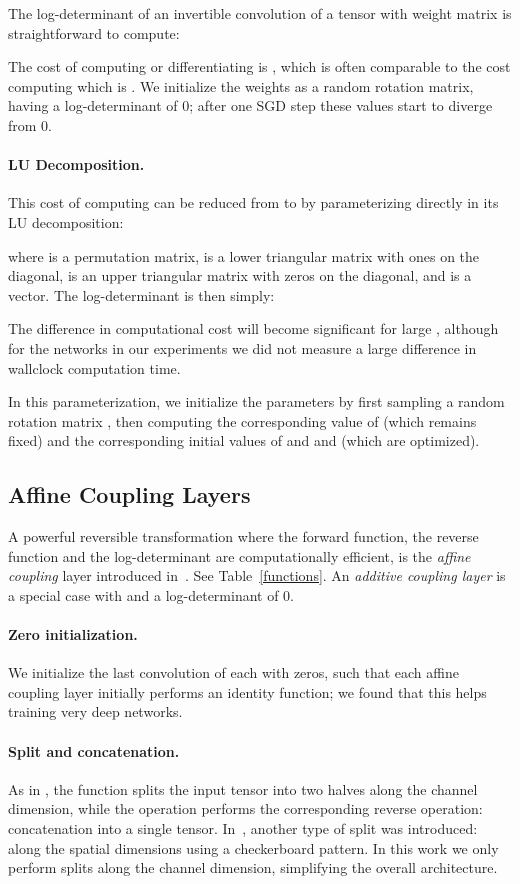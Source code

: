 \documentclass{article}
\begin{document}
The log-determinant of an invertible  convolution of a  tensor  with  weight matrix  is straightforward to compute:

The cost of computing or differentiating  is , which is often comparable to the cost computing  which is . We initialize the weights  as a random rotation matrix, having a log-determinant of 0; after one SGD step these values start to diverge from 0.

\paragraph{LU Decomposition.} This cost of computing  can be reduced from  to  by parameterizing  directly in its LU decomposition:

where  is a permutation matrix,  is a lower triangular matrix with ones on the diagonal,  is an upper triangular matrix with zeros on the diagonal, and  is a vector. The log-determinant is then simply:

The difference in computational cost will become significant for large , although for the networks in our experiments we did not measure a large difference in wallclock computation time.

In this parameterization, we initialize the parameters by first sampling a random rotation matrix , then computing the corresponding value of  (which remains fixed) and the corresponding initial values of  and  and  (which are optimized).

\subsection{Affine Coupling Layers}
\label{sec:affine}

A powerful reversible transformation where the forward function, the reverse function and the log-determinant are computationally efficient, is the \emph{affine coupling} layer introduced in~\citep{dinh2014nice,dinh2016density}. See Table~\ref{functions}. An \emph{additive coupling layer} is a special case with  and a log-determinant of 0.

\paragraph{Zero initialization.} We initialize the last convolution of each  with zeros, such that each affine coupling layer initially performs an identity function; we found that this helps training very deep networks.

\paragraph{Split and concatenation.} As in \citep{dinh2014nice}, the  function splits  the input tensor into two halves along the channel dimension, while the  operation performs the corresponding reverse operation: concatenation into a single tensor. In~\citep{dinh2016density}, another type of split was introduced: along the spatial dimensions using a checkerboard pattern. In this work we only perform splits along the channel dimension, simplifying the overall architecture.
\end{document}
